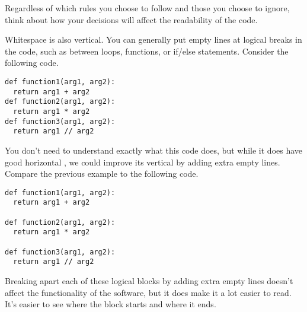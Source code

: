 Regardless of which  rules you choose to follow and those you choose to ignore, think about how your decisions will affect the readability of the code. \par
Whitespace is also vertical. You can generally put empty lines at logical breaks in the code, such as between loops, functions, or if/else statements. Consider the following code.\par
\begin{lstlisting}[style=pippython]
def function1(arg1, arg2):
  return arg1 + arg2
def function2(arg1, arg2):
  return arg1 * arg2
def function3(arg1, arg2):
  return arg1 // arg2
\end{lstlisting}
You don't need to understand exactly what this code does, but while it does have good horizontal , we could improve its vertical  by adding extra empty lines. Compare the previous example to the following code.\par
\begin{lstlisting}[style=pippython]
def function1(arg1, arg2):
  return arg1 + arg2

def function2(arg1, arg2):
  return arg1 * arg2

def function3(arg1, arg2):
  return arg1 // arg2
\end{lstlisting}
Breaking apart each of these logical blocks by adding extra empty lines doesn't affect the functionality of the software, but it does make it a lot easier to read. It's easier to see where the block starts and where it ends.
